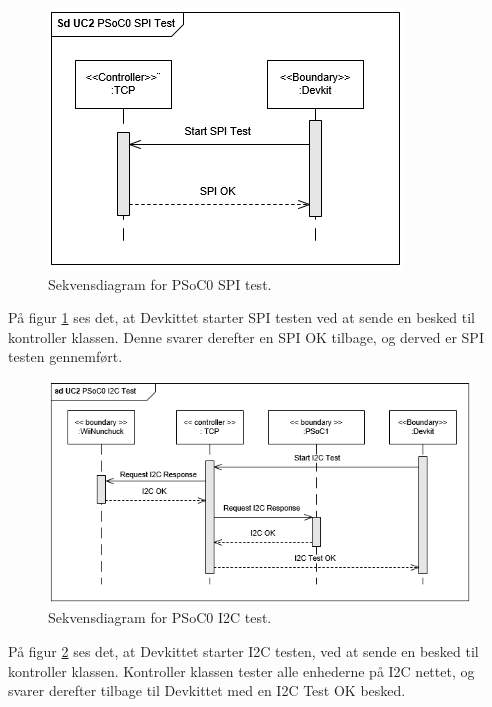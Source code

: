 \begin{figure}[H]
	\centering
	\includegraphics[width=.8\textwidth] {Systemarkitektur/images/SDPSoC0SPITest}
	\caption{Sekvensdiagram for PSoC0 SPI test.}
	\label{fig:sekvensPSoC0SPITest}
\end{figure}

På figur \ref{fig:sekvensPSoC0SPITest} ses det, at Devkittet starter SPI testen ved at sende en besked til kontroller klassen. Denne svarer derefter en SPI OK tilbage, og derved er SPI testen gennemført.

\begin{figure}[H]
	\centering
	\includegraphics[width=\textwidth] {Systemarkitektur/images/SDPSoC0I2CTest}
	\caption{Sekvensdiagram for PSoC0 I2C test.}
	\label{fig:sekvensPSoC0I2CTest}
\end{figure}

På figur \ref{fig:sekvensPSoC0I2CTest} ses det, at Devkittet starter I2C testen, ved at sende en besked til kontroller klassen. Kontroller klassen tester alle enhederne på I2C nettet, og svarer derefter tilbage til Devkittet med en I2C Test OK besked.

